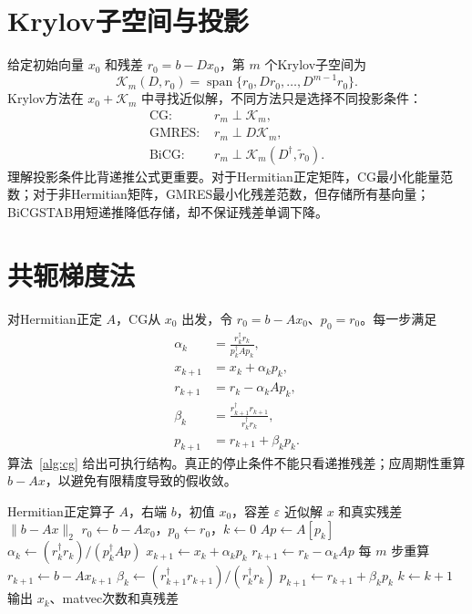 \documentclass[UTF8,12pt,a4paper,twoside,openany]{ctexbook}
\begin{document}
\section{Krylov子空间与投影}

给定初始向量 \(x_0\) 和残差 \(r_0=b-Dx_0\)，第 \(m\) 个Krylov子空间为
\begin{equation}
  \mathcal K_m(D,r_0)
  =\operatorname{span}\{r_0,Dr_0,\ldots,D^{m-1}r_0\}.
  \label{eq:krylov-space}
\end{equation}
Krylov方法在 \(x_0+\mathcal K_m\) 中寻找近似解，不同方法只是选择不同投影条件：
\begin{align}
  \text{CG: }&r_m\perp\mathcal K_m,\\
  \text{GMRES: }&r_m\perp D\mathcal K_m,\\
  \text{BiCG: }&r_m\perp\mathcal K_m(D^\dagger,\tilde r_0).
\end{align}
理解投影条件比背递推公式更重要。对于Hermitian正定矩阵，CG最小化能量范数；对于非Hermitian矩阵，GMRES最小化残差范数，但存储所有基向量；BiCGSTAB用短递推降低存储，却不保证残差单调下降。

\section{共轭梯度法}

对Hermitian正定 \(A\)，CG从 \(x_0\) 出发，令 \(r_0=b-Ax_0\)、\(p_0=r_0\)。每一步满足
\begin{align}
  \alpha_k&=\frac{r_k^\dagger r_k}{p_k^\dagger Ap_k},
  \label{eq:cg-alpha}\\
  x_{k+1}&=x_k+\alpha_kp_k,\\
  r_{k+1}&=r_k-\alpha_kAp_k,\\
  \beta_k&=\frac{r_{k+1}^\dagger r_{k+1}}{r_k^\dagger r_k},\\
  p_{k+1}&=r_{k+1}+\beta_kp_k.
  \label{eq:cg-beta}
\end{align}
算法~\ref{alg:cg} 给出可执行结构。真正的停止条件不能只看递推残差；应周期性重算 \(b-Ax\)，以避免有限精度导致的假收敛。

\begin{algorithm}[htbp]
\caption{带显式真残差检查的共轭梯度法。}
\label{alg:cg}
\begin{algorithmic}[1]
\Require Hermitian正定算子 \(A\)，右端 \(b\)，初值 \(x_0\)，容差 \(\varepsilon\)
\Ensure 近似解 \(x\) 和真实残差 \(\|b-Ax\|_2\)
\State \(r_0\gets b-Ax_0\)，\(p_0\gets r_0\)，\(k\gets0\)
  \State \(Ap\gets A[p_k]\)
  \State \(\alpha_k\gets(r_k^\dagger r_k)/(p_k^\dagger Ap)\)
  \State \(x_{k+1}\gets x_k+\alpha_kp_k\)
  \State \(r_{k+1}\gets r_k-\alpha_kAp\)
  \State 每 \(m\) 步重算 \(r_{k+1}\gets b-Ax_{k+1}\)
  \State \(\beta_k\gets(r_{k+1}^\dagger r_{k+1})/(r_k^\dagger r_k)\)
  \State \(p_{k+1}\gets r_{k+1}+\beta_kp_k\)
  \State \(k\gets k+1\)
\EndWhile
\State 输出 \(x_k\)、matvec次数和真残差
\end{algorithmic}
\end{algorithm}
\end{document}
